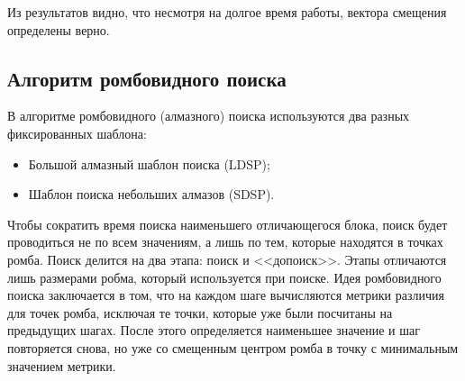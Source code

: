 Из результатов видно, что несмотря на долгое время работы, вектора смещения определены верно.

\subsection{Алгоритм ромбовидного поиска}

В алгоритме ромбовидного (алмазного) поиска используются два разных фиксированных шаблона:

\begin{itemize}
	\item Большой алмазный шаблон поиска (LDSP);
	\item Шаблон поиска небольших алмазов (SDSP).
\end{itemize}

Чтобы сократить время поиска наименьшего отличающегося блока, поиск будет проводиться не по всем значениям, а лишь по тем, которые находятся в точках ромба. Поиск делится на два этапа: поиск и <<допоиск>>. Этапы отличаются лишь размерами робма, который используется при поиске. Идея ромбовидного поиска заключается в том, что на каждом шаге вычисляются метрики различия для точек ромба, исключая те точки, которые уже были посчитаны на предыдущих шагах. После этого определяется наименьшее значение и шаг повторяется снова, но уже со смещенным центром ромба в точку с минимальным значением метрики.

